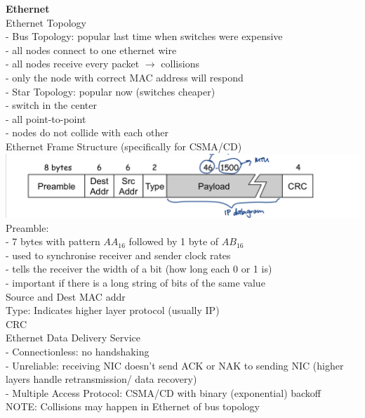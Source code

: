 \documentclass[10pt, a4paper]{article}
\newcommand{\red}[1]{{\color{red}#1}}
\newcommand{\tab}[0]{\hspace*{2mm}}
\begin{document}
\begin{multicols*}{3}
		\textbf{Ethernet}\\
		Ethernet Topology\\
		- Bus Topology: popular last time when switches were expensive\\
		\tab - all nodes connect to one ethernet wire\\
		\tab - all nodes receive every packet $\rightarrow$ collisions\\
		\tab - only the node with correct MAC address will respond\\
		- Star Topology: popular now (switches cheaper)\\
		\tab - switch in the center\\
		\tab - all point-to-point\\
		\tab - nodes do not collide with each other\\

		Ethernet Frame Structure (specifically for CSMA/CD)\\
		\includegraphics[scale=.16]{./assets/ethernetFrame}
		Preamble:\\
		- 7 bytes with pattern $AA_{16}$ followed by 1 byte of $AB_{16}$\\
		- used to synchronise receiver and sender clock rates\\
		- tells the receiver the width of a bit (how long each 0 or 1 is)\\
		- important if there is a long string of bits of the same value\\

		Source and Dest MAC addr\\

		Type: Indicates higher layer protocol (usually IP)\\

		CRC\\

		Ethernet Data Delivery Service\\
		- \red{Connectionless}: no handshaking\\
		- \red{Unreliable}: receiving NIC doesn't send ACK or NAK to sending NIC (higher layers handle retransmission/ data recovery)\\
		- \red{Multiple Access Protocol:} CSMA/CD with \red{binary (exponential) backoff}\\
		\red{NOTE}: Collisions may happen in Ethernet of bus topology\\


\end{multicols*}
\end{document}
